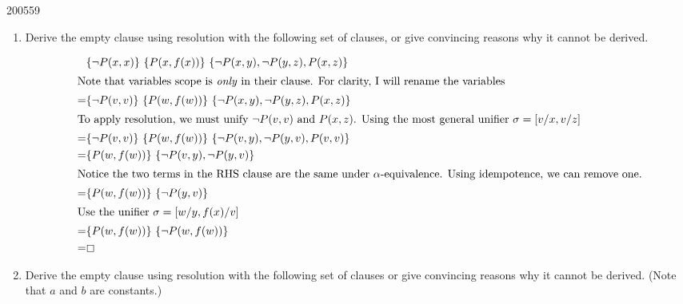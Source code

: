 \documentclass[10pt,\jkfside,a4paper]{article}
\begin{document}
\begin{examquestion}{2005}{5}{9}
\begin{enumerate}
\item Derive the empty clause using resolution with the following set of
clauses, or give convincing reasons why it cannot be derived.

\begin{align*}
 & \{\neg P(x, x)\}\ \{P(x, f(x))\}\ \{\neg P(x, y), \neg P(y, z), P(x, z)\} \\
\intertext{Note that variables scope is \textit{only} in their clause.
For clarity, I will rename the variables}
=& \{\neg P(v, v)\}\ \{P(w, f(w))\}\ \{\neg P(x, y), \neg P(y, z), P(x, z)\} \\
\intertext{To apply resolution, we must unify $\neg P(v, v)$ and $P(x, z)$.
Using the most general unifier $\sigma = [v/x, v/z]$}
=& \{\neg P(v, v)\}\ \{P(w, f(w))\}\ \{\neg P(v, y), \neg P(y, v), P(v, v)\} \\
=& \{P(w, f(w))\}\ \{\neg P(v, y), \neg P(y, v)\} \\
\intertext{Notice the two terms in the RHS clause are the same under
$\alpha$-equivalence. Using idempotence, we can remove one.}
=& \{P(w, f(w))\}\ \{\neg P(y, v)\} \\
\intertext{Use the unifier $\sigma = [w/y, f(x)/v]$}
=& \{P(w, f(w))\}\ \{\neg P(w, f(w))\} \\
=& \boxempty
\end{align*}

\item Derive the empty clause using resolution with the following set of
clauses or give convincing reasons why it cannot be derived. (Note that $a$
and $b$ are constants.)


\end{enumerate}
\end{examquestion}
\end{document}
